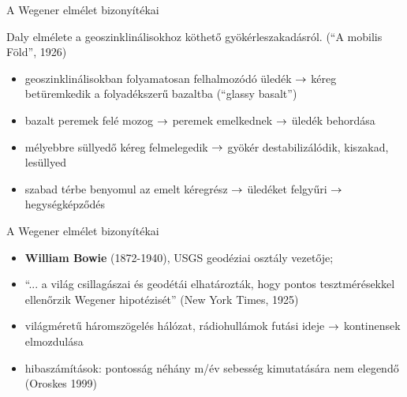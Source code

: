 \documentclass{beamer}
\begin{document}
\begin{frame}{A Wegener elmélet bizonyítékai}
    \begin{minipage}[c]{0.45\textwidth}
        \centering
        
        Daly elmélete a geoszinklinálisokhoz köthető gyökérleszakadásról. (``A mobilis Föld'', 1926)
    \end{minipage}
    \begin{minipage}[c]{0.45\textwidth}
        \begin{itemize}
            \item geoszinklinálisokban folyamatosan felhalmozódó üledék $\rightarrow$ kéreg betüremkedik a folyadékszerű bazaltba (``glassy basalt'')
            \item bazalt peremek felé mozog $\rightarrow$ peremek emelkednek $\rightarrow$ üledék behordása
            \item mélyebbre süllyedő kéreg felmelegedik $\rightarrow$ gyökér destabilizálódik, kiszakad, lesüllyed
            \item szabad térbe benyomul az emelt kéregrész $\rightarrow$ üledéket felgyűri $\rightarrow$ hegységképződés
        \end{itemize}
    \end{minipage}
\end{frame}


\begin{frame}{A Wegener elmélet bizonyítékai}
    \begin{itemize}
        \item \textbf{William Bowie} (1872-1940), USGS geodéziai osztály vezetője;
        \item ``... a világ csillagászai és geodétái elhatározták, hogy pontos tesztmérésekkel ellenőrzik Wegener hipotézisét'' (New York Times, 1925)
        \item világméretű háromszögelés hálózat, rádiohullámok futási ideje $\rightarrow$ kontinensek elmozdulása
        \item hibaszámítások: pontosság néhány m/év sebesség kimutatására nem elegendő (Oroskes 1999)
    \end{itemize}
\end{frame}
\end{document}
